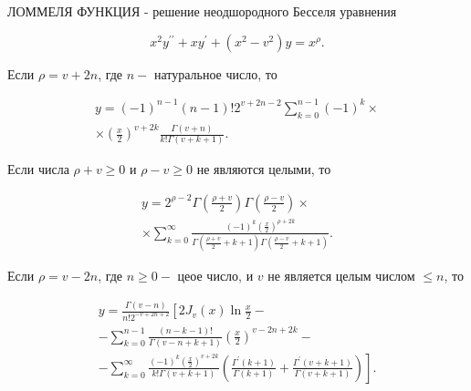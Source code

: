 \documentclass[10pt]{article}
\begin{document}
ЛОММЕЛЯ ФУНКЦИЯ - решение неодшородного Бесселя уравнения



\[

x^{2} y^{\prime \prime}+x y^{\prime}+\left(x^{2}-v^{2}\right) y=x^{\rho} .

\]



Если $\rho=v+2 n$, где $n-$ натуральное число, то



\[

\begin{gathered}

y=(-1)^{n-1}(n-1) ! 2^{v+2 n-2} \sum_{k=0}^{n-1}(-1)^{k} \times \\

\times\left(\frac{x}{2}\right)^{v+2 k} \frac{\Gamma(v+n)}{k ! \Gamma(v+k+1)} .

\end{gathered}

\]



Если числа $\rho+v \geqslant 0$ и $\rho-v \geqslant 0$ не являются целыми, то



\[

\begin{gathered}

y=2^{\rho-2} \Gamma\left(\frac{\rho+v}{2}\right) \Gamma\left(\frac{\rho-v}{2}\right) \times \\

\times \sum_{k=0}^{\infty} \frac{(-1)^{k}\left(\frac{x}{2}\right)^{\rho+2 k}}{\Gamma\left(\frac{\rho+v}{2}+k+1\right) \Gamma\left(\frac{\rho-v}{2}+k+1\right)} .

\end{gathered}

\]



Если $\rho=v-2 n$, где $n \geqslant 0-$ цеое число, и $v$ не является целым числом $\leqslant n$, то



\[

\begin{gathered}

y=\frac{\Gamma(v-n)}{n ! 2^{-v+2 n+2}}\left[2 J_{v}(x) \ln \frac{x}{2}-\right. \\

-\sum_{k=0}^{n-1} \frac{(n-k-1) !}{\Gamma(v-n+k+1)}\left(\frac{x}{2}\right)^{v-2 n+2 k}- \\

\left.-\sum_{k=0}^{\infty} \frac{(-1)^{k}\left(\frac{x}{2}\right)^{v+2 k}}{k ! \Gamma(v+k+1)}\left(\frac{\Gamma^{\prime}(k+1)}{\Gamma(k+1)}+\frac{\Gamma^{\prime}(v+k+1)}{\Gamma(v+k+1)}\right)\right] .

\end{gathered}

\]
\end{document}
